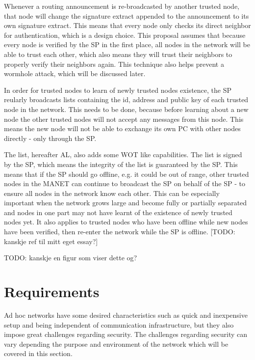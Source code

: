 Whenever a routing announcement is re-broadcasted by another trusted node, that
node will change the signature extract appended to the announcement to its own
signature extract. This means that every node only checks its direct neighbor
for authentication, which is a design choice. This proposal assumes that because
every node is verified by the \ac{SP} in the first place, all nodes in the
network will be able to trust each other, which also means they will trust their
neighbors to properly verify their neighbors again. This technique also helps
prevent a wormhole attack, which will be discussed later.

In order for trusted nodes to learn of newly trusted nodes existence, the
\ac{SP} reularly broadcasts lists containing the id, address and public key of
each trusted node in the network. This needs to be done, because before learning
about a new node the other trusted nodes will not accept any messages from this
node. This means the new node will not be able to exchange its own \ac{PC} with
other nodes directly - only through the \ac{SP}.

The list, hereafter \ac{AL}, also adds some \ac{WOT} like capabilities. The list
is signed by the \ac{SP}, which means the integrity of the list is guaranteed by
the \ac{SP}. This means that if the \ac{SP} should go offline, e.g. it could be
out of range, other trusted nodes in the \ac{MANET} can continue to broadcast
the \ac{SP} on behalf of the \ac{SP} - to ensure all nodes in the network know
each other. This can be especially important when the network grows large and
become fully or partially separated and nodes in one part may not have learnt of
the existence of newly trusted nodes yet. It also applies to trusted nodes who
have been offline while new nodes have been verified, then re-enter the network
while the \ac{SP} is offline. [TODO: kanskje ref til mitt eget essay?]

TODO: kanskje en figur som viser dette og?

\section{Requirements}
Ad hoc networks have some desired characteristics such as quick and inexpensive
setup and being independent of communication infrastructure, but they also
impose great challenges regarding security. The challenges regarding security
can vary depending the purpose and environment of the network which will be
covered in this section.

